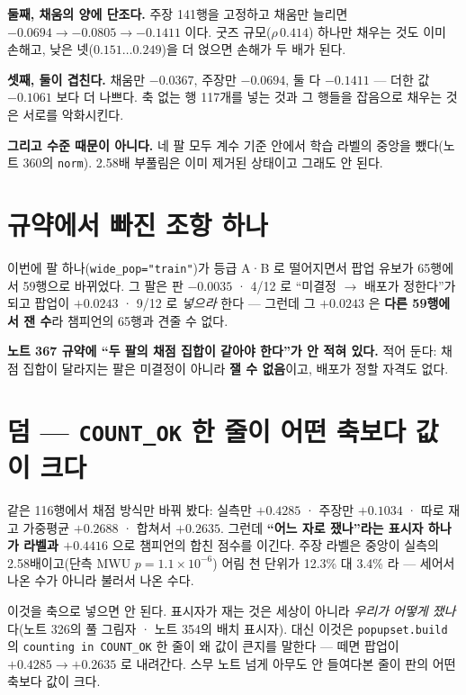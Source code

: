 \documentclass[11pt]{article}
\begin{document}
\textbf{둘째, 채움의 양에 단조다.} 주장 141행을 고정하고 채움만 늘리면
$-0.0694 \to -0.0805 \to -0.1411$ 이다. 굿즈 규모($\rho\,0.414$) 하나만
채우는 것도 이미 손해고, 낮은 넷($0.151\ldots0.249$)을 더 얹으면 손해가
두 배가 된다.

\textbf{셋째, 둘이 겹친다.} 채움만 $-0.0367$, 주장만 $-0.0694$, 둘 다
$-0.1411$ --- 더한 값 $-0.1061$ 보다 더 나쁘다. 축 없는 행 117개를 넣는
것과 그 행들을 잡음으로 채우는 것은 서로를 악화시킨다.

\textbf{그리고 수준 때문이 아니다.} 네 팔 모두 계수 기준 안에서 학습
라벨의 중앙을 뺐다(노트 360의 \texttt{norm}). 2.58배 부풀림은 이미
제거된 상태이고 그래도 안 된다.

\section{규약에서 빠진 조항 하나}

이번에 팔 하나(\texttt{wide\_pop="train"})가 등급 A·B 로 떨어지면서 팝업
유보가 65행에서 59행으로 바뀌었다. 그 팔은 판 $-0.0035$ · 4/12 로
``미결정 $\to$ 배포가 정한다''가 되고 팝업이 $+0.0243$ · 9/12 로 \emph{넣으라}
한다 --- 그런데 그 $+0.0243$ 은 \textbf{다른 59행에서 잰 수}라 챔피언의
65행과 견줄 수 없다.

\textbf{노트 367 규약에 ``두 팔의 채점 집합이 같아야 한다''가 안 적혀
있다.} 적어 둔다: 채점 집합이 달라지는 팔은 미결정이 아니라
\textbf{잴 수 없음}이고, 배포가 정할 자격도 없다.

\section{덤 --- \texttt{COUNT\_OK} 한 줄이 어떤 축보다 값이 크다}

같은 116행에서 채점 방식만 바꿔 봤다: 실측만 $+0.4285$ · 주장만
$+0.1034$ · 따로 재고 가중평균 $+0.2688$ · 합쳐서 $+0.2635$. 그런데
\textbf{``어느 자로 쟀나''라는 표시자 하나가 라벨과 $+0.4416$} 으로
챔피언의 합친 점수를 이긴다. 주장 라벨은 중앙이 실측의 2.58배이고(단측
MWU $p=1.1\times10^{-6}$) 어림 천 단위가 12.3\% 대 3.4\% 라 --- 세어서
나온 수가 아니라 불러서 나온 수다.

이것을 축으로 넣으면 안 된다. 표시자가 재는 것은 세상이 아니라 \emph{우리가
어떻게 쟀나}다(노트 326의 풀 그림자 · 노트 354의 배치 표시자). 대신 이것은
\texttt{popupset.build} 의 \texttt{counting in COUNT\_OK} 한 줄이 왜 값이
큰지를 말한다 --- 떼면 팝업이 $+0.4285 \to +0.2635$ 로 내려간다. 스무 노트
넘게 아무도 안 들여다본 줄이 판의 어떤 축보다 값이 크다.
\end{document}
